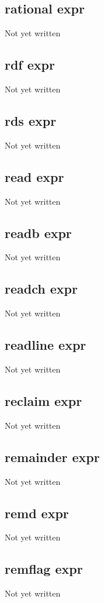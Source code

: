 \documentclass[a4paper,11pt]{article}
\begin{document}
\subsection{\ttfamily rational expr}
Not yet written

\subsection{\ttfamily rdf expr}
Not yet written

\subsection{\ttfamily rds expr}
Not yet written

\subsection{\ttfamily read expr}
Not yet written

\subsection{\ttfamily readb expr}
Not yet written

\subsection{\ttfamily readch expr}
Not yet written

\subsection{\ttfamily readline expr}
Not yet written

\subsection{\ttfamily reclaim expr}
Not yet written

\subsection{\ttfamily remainder expr}
Not yet written

\subsection{\ttfamily remd expr}
Not yet written

\subsection{\ttfamily remflag expr}
Not yet written
\end{document}
